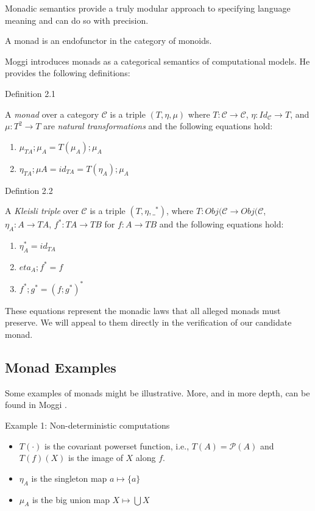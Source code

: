 \documentclass[ms]{byuprop}
\begin{document}
Monadic semantics provide a truly modular approach to specifying language meaning and can
do so with precision.


A monad is an endofunctor in the category of monoids.

Moggi \cite{moggi1989computational} introduces monads as a categorical semantics of
computational models. He provides the following definitions:

Definition 2.1

A \emph{monad} over a category $\mathcal{C}$ is a triple $(T,\eta,\mu)$ where
$T:\mathcal{C}\rightarrow\mathcal{C}$, $\eta:Id_{\mathcal{C}}\rightarrow T$, and
$\mu:T^{2}\rightarrow T$ are \emph{natural transformations} and the following equations
hold:

\begin{enumerate}
\item $\mu_{TA};\mu_{A}=T(\mu_{A});\mu_{A}$
\item $\eta_{TA};\mu{A}=id_{TA}=T(\eta_{A});\mu_{A}$
\end{enumerate}

Defintion 2.2

A \emph{Kleisli triple} over $\mathcal{C}$ is a triple $(T,\eta,\_^{*})$, where
$T:Obj(\mathcal{C}\rightarrow Obj(\mathcal{C}$, $\eta_{A}:A\rightarrow TA$,
$f^{*}:TA\rightarrow TB$ for $f:A\rightarrow TB$ and the following equations hold:

\begin{enumerate}
\item $\eta_{A}^{*}=id_{TA}$
\item $eta_{A};f^{*}=f$
\item $f^{*};g^{*}=(f;g^{*})^{*}$
\end{enumerate}

These equations represent the monadic laws that all alleged monads must preserve. We will
appeal to them directly in the verification of our candidate monad.

\subsection{Monad Examples}

Some examples of monads might be illustrative. More, and in more depth, can be found in 
Moggi \cite{moggi1989computational}.

Example 1: Non-deterministic computations

\begin{itemize}
\item $T(\cdot)$ is the covariant powerset function, i.e., $T(A)=\mathcal{P}(A)$ and 
$T(f)(X)$ is the image of $X$ along $f$.
\item $\eta_{A}$ is the singleton map $a\mapsto \{a\}$
\item $\mu_{A}$ is the big union map $X\mapsto\bigcup X$
\end{itemize}
\end{document}
